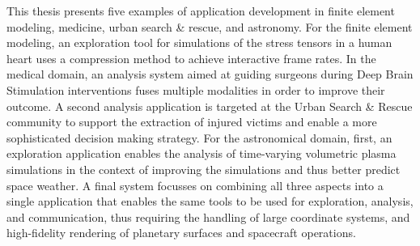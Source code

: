 This thesis presents five examples of application development in finite element modeling, medicine, urban search \& rescue, and astronomy.  For the finite element modeling, an exploration tool for simulations of the stress tensors in a human heart uses a compression method to achieve interactive frame rates.  In the medical domain, an analysis system aimed at guiding surgeons during Deep Brain Stimulation interventions fuses multiple modalities in order to improve their outcome.  A second analysis application is targeted at the Urban Search \& Rescue community to support the extraction of injured victims and enable a more sophisticated decision making strategy.  For the astronomical domain, first, an exploration application enables the analysis of time-varying volumetric plasma simulations in the context of improving the simulations and thus better predict space weather.  A final system focusses on combining all three aspects into a single application that enables the same tools to be used for exploration, analysis, and communication, thus requiring the handling of large coordinate systems, and high-fidelity rendering of planetary surfaces and spacecraft operations.
